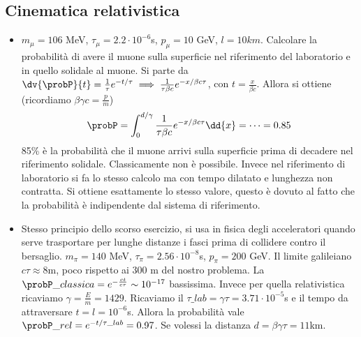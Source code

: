 \subsection{Cinematica relativistica}
\begin{itemize}
    \item $m_\mu=106$ MeV, $\tau_\mu=2.2\cdot10^{-6}$s, $p_\mu=10$ GeV, $l=10km$. Calcolare la probabilità di avere il muone sulla superficie nel riferimento del laboratorio e in quello solidale al muone. Si parte da $\dv{\probP}{t}=\frac1\tau e^{-t/\tau}\implies \frac1{\tau\beta c}e^{-x/\beta c\tau}$, con $t=\frac x{\beta c}$. Allora si ottiene  (ricordiamo $\beta\gamma c=\frac p m$)
    \begin{equation*}
    \probP=\int_0^{d/\gamma}\frac1{\tau\beta c}e^{-x/\beta c \tau}\dd{x}=\dots =0.85
    \end{equation*}
    85\% è la probabilità che il muone arrivi sulla superficie prima di decadere nel riferimento solidale. Classicamente non è possibile. Invece nel riferimento di laboratorio si fa lo stesso calcolo ma con tempo dilatato e lunghezza non contratta. Si ottiene esattamente lo stesso valore, questo è dovuto al fatto che la probabilità è indipendente dal sistema di riferimento.
    \item Stesso principio dello scorso esercizio, si usa in fisica degli acceleratori quando serve trasportare per lunghe distanze i fasci prima di collidere contro il bersaglio. $m_\pi=140$ MeV, $\tau_\pi=2.56\cdot10^{-8}$s, $p_\pi=200$ GeV. Il limite galileiano $c\tau\approx 8$m, poco rispetto ai 300 m del nostro problema. La $\probP\_{classica}=e^{-\frac{ct}{c\tau}}\sim 10^{-17}$ bassissima. Invece per quella relativistica ricaviamo $\gamma=\frac E {m}=1429$. Ricaviamo il $\tau\_{lab}=\gamma \tau =3.71\cdot 10^{-5}$s e il tempo da attraversare $t=l=10^{-6}$s. Allora la probabilità vale $\probP\_{rel}=e^{-t/\tau\_{lab}}=0.97$. Se volessi la distanza $d=\beta \gamma \tau=11$km.
\end{itemize}
